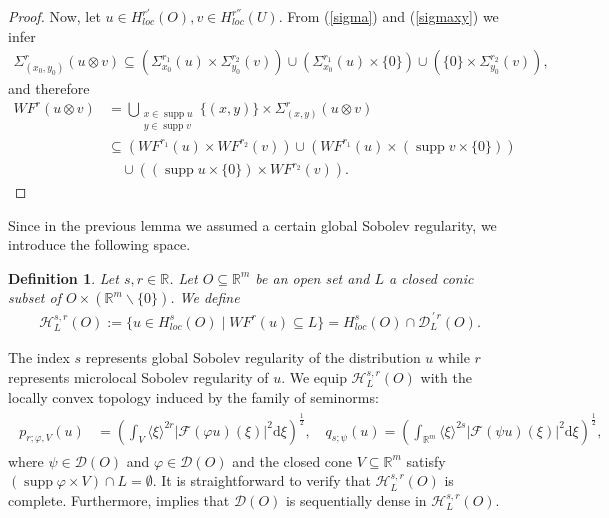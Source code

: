 \documentclass{amsart}
\newtheorem{definition}{Definition}[section]
\newcommand{\supp}{\operatorname{supp}}
\theoremstyle{definition}
\begin{document}
\begin{proof}
Now, let $u\in H_{loc} ^{r'} (O), v\in H_{loc} ^{r''} (U)$. From (\ref{sigma}) and (\ref{sigmaxy}) we infer
\begin{align*}
\Sigma_{(x_0 , y_0)} ^r (u\otimes v)
\subseteq (\Sigma_{x_0 } ^{r_1} (u) \times \Sigma_{y_0 } ^{r_2} (v)) \cup (\Sigma_{x_0 } ^{r_1} (u) \times \{0 \}) \cup ( \{0 \} \times \Sigma_{y_0 } ^{r_2} (v)),
\end{align*}
and therefore
\begin{align*}
WF^r (u\otimes v)
&= \bigcup_{\substack{ x\in\supp u \\ y\in \supp v }} \{(x,y)\} \times \Sigma_{(x,y)} ^r (u\otimes v)\\
&\subseteq (WF^{r_1} (u) \times WF^{r_2} (v)) \cup (WF^{r_1} (u) \times (\supp v \times \{0\}))\\
&\quad \cup ((\supp u \times \{0 \}) \times WF^{r_2} (v)).
\end{align*}
\end{proof}

Since in the previous lemma we assumed a certain global Sobolev regularity, we introduce the following space.

\begin{definition}
\label{definicija_prostora}
Let $s,r\in\mathbb{R}$. Let $O\subseteq\mathbb{R}^m$ be an open set and $L$ a closed conic subset of $O\times (\mathbb{R}^m \backslash \{0\})$. We define
\begin{align*}
\mathscr{H}_L ^{s,r} (O) := \{ u\in H_{loc} ^s (O) \mid WF^r (u) \subseteq L \}=H_{loc} ^s (O)\cap \mathcal{D}_{L}^{\,\prime\, r} (O).
\end{align*}
\end{definition}
The index $s$ represents global Sobolev regularity of the distribution $u$ while $r$ represents microlocal Sobolev regularity of $u$. We equip $\mathscr{H}_L ^{s,r} (O)$ with the locally convex topology induced by the family of seminorms:
\begin{align}
\label{seminorme}
\begin{split}
p_{r;\varphi,V} (u)
&= \left( \int_V \langle \xi \rangle^{2r} |\mathcal{F} (\varphi u) (\xi)|^2 \mathrm{d}\xi \right)^{\frac{1}{2}}, \quad
q_{s;\psi} (u)
= \left( \int_{\mathbb{R}^m} \langle \xi \rangle^{2s} |\mathcal{F} (\psi u) (\xi)|^2 \mathrm{d}\xi \right)^{\frac{1}{2}},
\end{split}
\end{align}
where $\psi\in\mathcal{D}(O)$ and $\varphi\in\mathcal{D} (O)$ and the closed cone $V\subseteq \mathbb{R}^m$ satisfy $(\supp \varphi \times V) \cap L = \emptyset$. It is straightforward to verify that $\mathscr{H}^{s,r}_L(O)$ is complete. Furthermore, \cite[Proposition 3.13]{PP} implies that $\mathcal{D}(O)$ is sequentially dense in $\mathscr{H}_L ^{s,r} (O)$.
\end{document}
